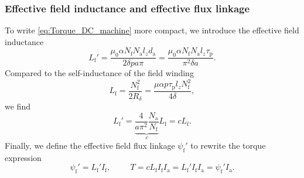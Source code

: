 \begin{frame}
	\frametitle{Effective field inductance and effective flux linkage}
    To write \eqref{eq:Torque_DC_machine} more compact, we introduce the effective field inductance 
	\begin{equation}
		L_\mathrm{f}' =  \frac{\mu_0 \alpha N_\mathrm{f} N_\mathrm{a} l_z d_\mathrm{a}}{2 \delta p a \pi} = \frac{\mu_0 \alpha N_\mathrm{f} N_\mathrm{a} l_z \tau_\mathrm{p}}{\pi^2  \delta a}.
		\label{eq:Effective_field_inductance}
	\end{equation} \pause
	Compared to the self-inductance of the field winding 
	\begin{equation}
		L_\mathrm{f} = \frac{N_\mathrm{f}^2}{2 R_\delta} = \frac{\mu  \alpha p \tau_\mathrm{p} l_z N_\mathrm{f}^2}{4 \delta},
	 \end{equation} \pause
	 we find
	 \begin{equation}
		 L_\mathrm{f}' = \underbrace{\frac{4}{a \pi^2}\frac{N_\mathrm{a}}{N_\mathrm{f}}}_{c} L_\mathrm{f}  = c L_\mathrm{f} .
	\end{equation} \pause
	Finally, we define the effective field flux linkage $\psi_\mathrm{f}'$ to rewrite the torque expression
	\begin{equation}
		\psi_\mathrm{f}' = L_\mathrm{f}' I_\mathrm{f}, \hspace{1cm} T = c L_\mathrm{f} I_\mathrm{f} I_\mathrm{a} = L_\mathrm{f}' I_\mathrm{f} I_\mathrm{a}  = \psi_\mathrm{f}' I_\mathrm{a}.
		\label{eq:Effective_field_flux_linkage}
	\end{equation}
\end{frame}


